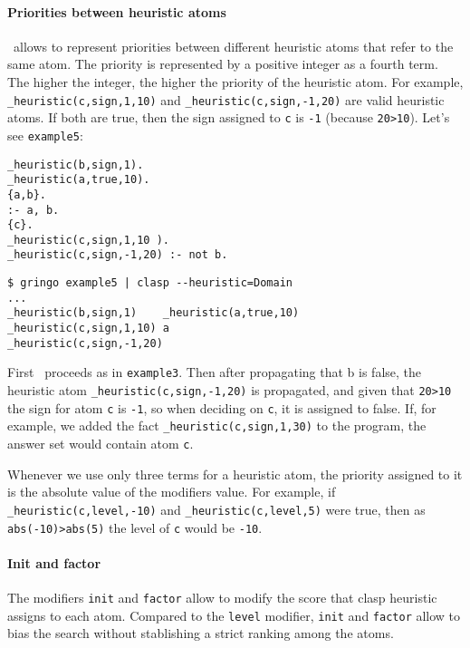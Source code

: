 \paragraph{Priorities between heuristic atoms}

\clasp\ allows to represent priorities between different heuristic atoms that refer to the same atom.  
The priority is represented by a positive integer as a fourth term. 
The higher the integer, the higher the priority of the heuristic atom. 
For example, \texttt{\_heuristic(c,sign,1,10)} and \texttt{\_heuristic(c,sign,-1,20)} are valid heuristic atoms. 
If both are true, then the sign assigned to \texttt{c} is \texttt{-1} (because \texttt{20>10}).  Let's see \texttt{example5}: 
\begin{verbatim}
_heuristic(b,sign,1).
_heuristic(a,true,10).
{a,b}.
:- a, b.
{c}.
_heuristic(c,sign,1,10 ).
_heuristic(c,sign,-1,20) :- not b.
\end{verbatim}
\begin{verbatim}
$ gringo example5 | clasp --heuristic=Domain                                                                                
...
_heuristic(b,sign,1)    _heuristic(a,true,10) 
_heuristic(c,sign,1,10) a
_heuristic(c,sign,-1,20)\end{verbatim}

First \clasp\ proceeds as in \texttt{example3}. 
Then after propagating that b is false,  the heuristic atom \texttt{\_heuristic(c,sign,-1,20)} is propagated, 
and given that \texttt{20>10} the sign for atom \texttt{c} is \texttt{-1}, so when deciding on \texttt{c}, it is assigned to false.  
If, for example, we added the fact \texttt{\_heuristic(c,sign,1,30)} to the program, the answer set would contain atom \texttt{c}. 

Whenever we use only three terms for a heuristic atom, the priority assigned to it is the absolute value of the modifiers value.  
For example, if \texttt{\_heuristic(c,level,-10)} and \texttt{\_heuristic(c,level,5)} were true,  
then as \texttt{abs(-10)>abs(5)} the level of \texttt{c} would be \texttt{-10}. 

\paragraph{Init and factor}

The modifiers \texttt{init} and \texttt{factor} allow to modify the score that clasp heuristic assigns to each atom.  
Compared to the \texttt{level} modifier, \texttt{init} and \texttt{factor} allow to bias the search without stablishing a strict ranking among the atoms. 

